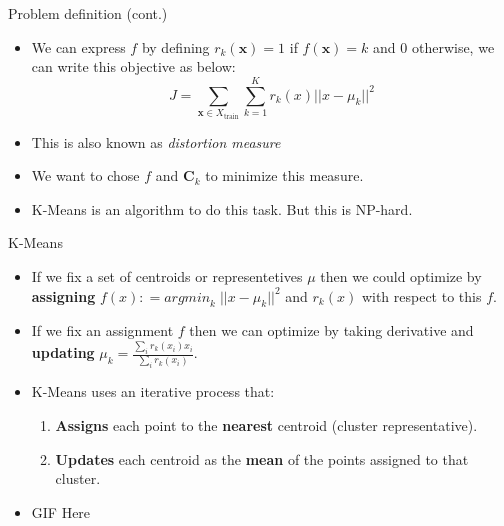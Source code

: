 \documentclass[serif, aspectratio=169]{beamer}
\begin{document}
\begin{frame}{Problem definition (cont.)}
    \begin{itemize}
        

        \item  We can express $f$ by defining $r_k(\mathbf{x}) = 1$ if $f(\mathbf{x}) = k$ and $0$ otherwise, we can write this objective as below:
$$
J = \sum_{\mathbf{x} \in X_{\text{train}}} \sum_{k=1}^{K} r_k(x)|| x -  \mu_k ||^2
$$
        \item This is also known as \textit{distortion measure}
        \item We want to chose $f$ and $\mathbf{C}_k$ to minimize this measure.
        \item K-Means is an algorithm to do this task. But this is NP-hard.

        
    \end{itemize}
\end{frame}


\begin{frame}{K-Means }
    \begin{itemize}
   

\item If we fix a set of centroids or representetives $\mu$ then we could optimize by \textbf{assigning} $f(x) : = \textit{argmin}_k \; ||x - \mu_k||^2$ and $r_k(x)$ with respect to this $f$.
\item If we fix an assignment $f$ then we can optimize by taking derivative and \textbf{updating} $\mu_k = \frac{\sum_i r_k(x_i) x_i}{\sum_i r_k(x_i) }$.
\item K-Means uses an iterative process that:
\begin{enumerate}
    \item \textbf{Assigns} each point to the \textbf{nearest} centroid (cluster representative).
    \item \textbf{Updates} each centroid as the \textbf{mean} of the points assigned to that cluster.

\end{enumerate}
    \item GIF Here
    \end{itemize}
\end{frame}
\end{document}
